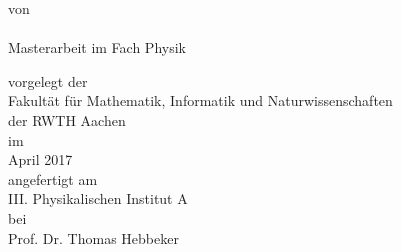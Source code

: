 
\makeatletter
\begin{titlepage}
		\tgherosfont
		\centering
		
		\Large
		
		\vspace*{\fill}
		
		{
			\fontsize{30pt}{28pt}\selectfont\bfseries \color{ctcolormain}
			\@title
		}
		
		\vspace{24mm}
		
		\textsf{von} \\
		{\LARGE \@author} \\[32mm]
		
		Masterarbeit im Fach Physik \\[8mm]
		
		\large
		
		\textsf{vorgelegt der} \\
		Fakultät für Mathematik, Informatik und Naturwissenschaften \\der RWTH Aachen \\[8mm]
		
		\textsf{im} \\
		April 2017 \\[8mm]
		
		\textsf{angefertigt am} \\
		III. Physikalischen Institut A \\[8mm]
		
		\textsf{bei} \\
		Prof. Dr. Thomas Hebbeker \\
\end{titlepage}
\makeatother